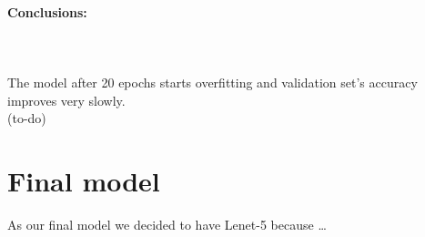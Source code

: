 \documentclass[12pt]{article}
\begin{document}
        \paragraph{Conclusions:} \mbox{} \\\\
        The model after 20 epochs starts overfitting and validation set's accuracy improves very slowly.
        \\(to-do)
    \section{Final model}
      As our final model we decided to have Lenet-5 because \dots
      \inputminted[linenos]{python}{code/final_model.py}
\end{document}
